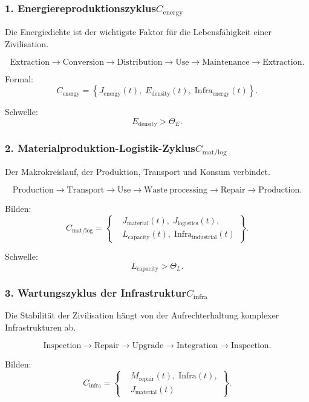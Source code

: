 \subsubsection{1. Energiereproduktionszyklus$C_{\mathrm{energy}}$}

Die Energiedichte ist der wichtigste Faktor für die Lebensfähigkeit einer Zivilisation.

\[
  \mathrm{Extraction}
  \to
  \mathrm{Conversion}
  \to
  \mathrm{Distribution}
  \to
  \mathrm{Use}
  \to
  \mathrm{Maintenance}
  \to
  \mathrm{Extraction}.
\]

Formal:
\[
  C_{\mathrm{energy}} =
  \left\{
    J_{\mathrm{energy}}(t),\;
    E_{\mathrm{density}}(t),\;
    \mathrm{Infra}_{\mathrm{energy}}(t)
  \right\}.
\]

Schwelle:
\[
  E_{\mathrm{density}} > \Theta_E.
\]

\subsubsection{2. Materialproduktion-Logistik-Zyklus$C_{\mathrm{mat/log}}$}

Der Makrokreislauf, der Produktion, Transport und Konsum verbindet.

\[
  \mathrm{Production}
  \to
  \mathrm{Transport}
  \to
  \mathrm{Use}
  \to
  \mathrm{Waste\;processing}
  \to
  \mathrm{Repair}
  \to
  \mathrm{Production}.
\]

Bilden:
\[
 C_{\mathrm{mat/log}} =
 \left\{
 \begin{aligned}
   &J_{\mathrm{material}}(t),\;
    J_{\mathrm{logistics}}(t),\\
   &L_{\mathrm{capacity}}(t),\;
    \mathrm{Infra}_{\mathrm{industrial}}(t)
 \end{aligned}
 \right\}.
\]

Schwelle:
\[
  L_{\mathrm{capacity}} > \Theta_L.
\]

\subsubsection{3. Wartungszyklus der Infrastruktur$C_{\mathrm{infra}}$}

Die Stabilität der Zivilisation hängt von der Aufrechterhaltung komplexer Infrastrukturen ab.

\[
  \mathrm{Inspection}
  \to
  \mathrm{Repair}
  \to
  \mathrm{Upgrade}
  \to
  \mathrm{Integration}
  \to
  \mathrm{Inspection}.
\]

Bilden:
\[
  C_{\mathrm{infra}} =
  \left\{
  \begin{aligned}
     &M_{\mathrm{repair}}(t),\;
      \mathrm{Infra}(t),\\
     &J_{\mathrm{material}}(t)
  \end{aligned}
  \right\}.
\]

